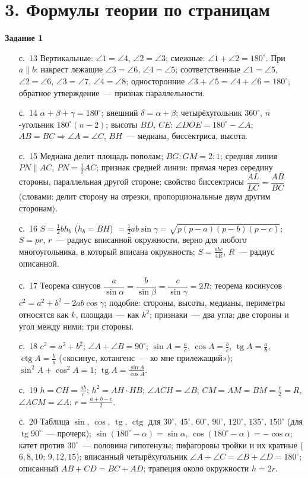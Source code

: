 \documentclass[fontsize=10pt]{scrartcl}
\begin{document}
\section*{3. Формулы теории по страницам}
\textbf{Задание 1}
\begin{itemize}
\item[с.~13] Вертикальные: $\angle1=\angle4$, $\angle2=\angle3$; смежные: $\angle1+\angle2=180^\circ$. При $a\parallel b$: накрест лежащие $\angle3=\angle6$, $\angle4=\angle5$; соответственные $\angle1=\angle5$, $\angle2=\angle6$, $\angle3=\angle7$, $\angle4=\angle8$; односторонние $\angle3+\angle5=\angle4+\angle6=180^\circ$; обратное утверждение~— признак параллельности.
\item[с.~14] $\alpha+\beta+\gamma=180^\circ$; внешний $\delta=\alpha+\beta$; четырёхугольник $360^\circ$, $n$-угольник $180^\circ(n-2)$; высоты $BD$, $CE$: $\angle DOE=180^\circ-\angle A$; $AB=BC\Rightarrow\angle A=\angle C$, $BH$~— медиана, биссектриса, высота.
\item[с.~15] Медиана делит площадь пополам; $BG:GM=2:1$; средняя линия $PN\parallel AC$, $PN=\tfrac12AC$; признак средней линии: прямая через середину стороны, параллельная другой стороне; свойство биссектрисы $\dfrac{AL}{LC}=\dfrac{AB}{BC}$ (словами: делит сторону на отрезки, пропорциональные двум другим сторонам).
\item[с.~16] $S=\tfrac12bh_b$ ($h_b=BH$) $=\tfrac12ab\sin\gamma=\sqrt{p(p-a)(p-b)(p-c)}$; $S=pr$, $r$~— радиус вписанной окружности, верно для любого многоугольника, в который вписана окружность; $S=\tfrac{abc}{4R}$, $R$~— радиус описанной.
\item[с.~17] Теорема синусов $\dfrac{a}{\sin\alpha}=\dfrac{b}{\sin\beta}=\dfrac{c}{\sin\gamma}=2R$; теорема косинусов $c^2=a^2+b^2-2ab\cos\gamma$; подобие: стороны, высоты, медианы, периметры относятся как $k$, площади~— как $k^2$; признаки~— два угла; две стороны и угол между ними; три стороны.
\item[с.~18] $c^2=a^2+b^2$; $\angle A+\angle B=90^\circ$; $\sin A=\tfrac ac$, $\cos A=\tfrac bc$, $\operatorname{tg}A=\tfrac ab$, $\operatorname{ctg}A=\tfrac ba$ («косинус, котангенс~— ко мне прилежащий»); $\sin^2A+\cos^2A=1$; $\operatorname{tg}A=\tfrac{\sin A}{\cos A}$.
\item[с.~19] $h=CH=\tfrac{ab}c$; $h^2=AH\cdot HB$; $\angle ACH=\angle B$; $CM=AM=BM=\tfrac c2=R$, $\angle ACM=\angle A$; $r=\tfrac{a+b-c}2$.
\item[с.~20] Таблица $\sin$, $\cos$, $\operatorname{tg}$, $\operatorname{ctg}$ для $30^\circ$, $45^\circ$, $60^\circ$, $90^\circ$, $120^\circ$, $135^\circ$, $150^\circ$ (для $\operatorname{tg}90^\circ$~— прочерк); $\sin(180^\circ-\alpha)=\sin\alpha$, $\cos(180^\circ-\alpha)=-\cos\alpha$; катет против $30^\circ$~— половина гипотенузы; пифагоровы тройки и их кратные ($6,8,10$; $9,12,15$); вписанный четырёхугольник $\angle A+\angle C=\angle B+\angle D=180^\circ$; описанный $AB+CD=BC+AD$; трапеция около окружности $h=2r$.

\end{itemize}
\end{document}
